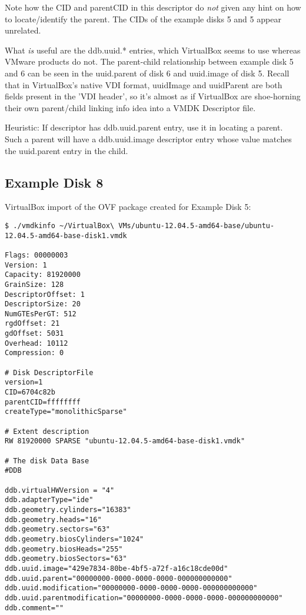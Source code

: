 \documentclass{article}
\begin{document}
Note how the CID and parentCID in this descriptor do {\em not} given
any hint on how to locate/identify the parent. The CIDs of the example
disks 5 and 5 appear unrelated.

What {\em is} useful are the ddb.uuid.* entries, which VirtualBox
seems to use whereas VMware products do not.  The parent-child
relationship between example disk 5 and 6 can be seen in the
uuid.parent of disk 6 and uuid.image of disk 5.  Recall that in
VirtualBox's native VDI format, uuidImage and uuidParent are both
fields present in the 'VDI header', so it's almost as if VirtualBox
are shoe-horning their own parent/child linking info idea into a VMDK
Descriptor file.


Heuristic: If descriptor has ddb.uuid.parent entry, use it in locating
a parent.  Such a parent will have a ddb.uuid.image descriptor entry
whose value matches the uuid.parent entry in the child.


\subsection{Example Disk 8}

VirtualBox import of the OVF package created for Example Disk 5:

\begin{verbatim}
$ ./vmdkinfo ~/VirtualBox\ VMs/ubuntu-12.04.5-amd64-base/ubuntu-12.04.5-amd64-base-disk1.vmdk 

Flags: 00000003
Version: 1
Capacity: 81920000
GrainSize: 128
DescriptorOffset: 1
DescriptorSize: 20
NumGTEsPerGT: 512
rgdOffset: 21
gdOffset: 5031
Overhead: 10112
Compression: 0

# Disk DescriptorFile
version=1
CID=6704c82b
parentCID=ffffffff
createType="monolithicSparse"

# Extent description
RW 81920000 SPARSE "ubuntu-12.04.5-amd64-base-disk1.vmdk"

# The disk Data Base 
#DDB

ddb.virtualHWVersion = "4"
ddb.adapterType="ide"
ddb.geometry.cylinders="16383"
ddb.geometry.heads="16"
ddb.geometry.sectors="63"
ddb.geometry.biosCylinders="1024"
ddb.geometry.biosHeads="255"
ddb.geometry.biosSectors="63"
ddb.uuid.image="429e7834-80be-4bf5-a72f-a16c18cde00d"
ddb.uuid.parent="00000000-0000-0000-0000-000000000000"
ddb.uuid.modification="00000000-0000-0000-0000-000000000000"
ddb.uuid.parentmodification="00000000-0000-0000-0000-000000000000"
ddb.comment=""
\end{verbatim}
\end{document}
